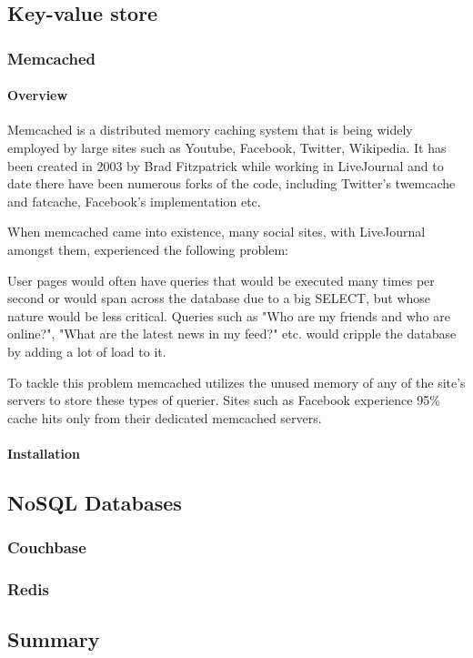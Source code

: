 \subsection{Key-value store}

\subsubsection{Memcached}

\paragraph{Overview}

Memcached is a distributed memory caching system that is being widely employed 
by large sites such as Youtube, Facebook, Twitter, Wikipedia. It has been 
created in 2003 by Brad Fitzpatrick while working in LiveJournal and to date 
there have been numerous forks of the code, including Twitter's twemcache and 
fatcache, Facebook's implementation etc.

When memcached came into existence, many social sites, with LiveJournal amongst 
them, experienced the following problem:

User pages would often have queries that would be executed many times per 
second or would span across the database due to a big SELECT, but whose nature 
would be less critical. Queries such as "Who are my friends and who are 
online?", "What are the latest news in my feed?" etc. would cripple the 
database by adding a lot of load to it.

To tackle this problem memcached utilizes the unused memory of any of the 
site's servers to store these types of querier. Sites such as Facebook 
experience 95\% cache hits only from their dedicated memcached servers.

\paragraph{Installation}


\subsection{NoSQL Databases}

\subsubsection{Couchbase}

\subsubsection{Redis}

\subsection{Summary}






